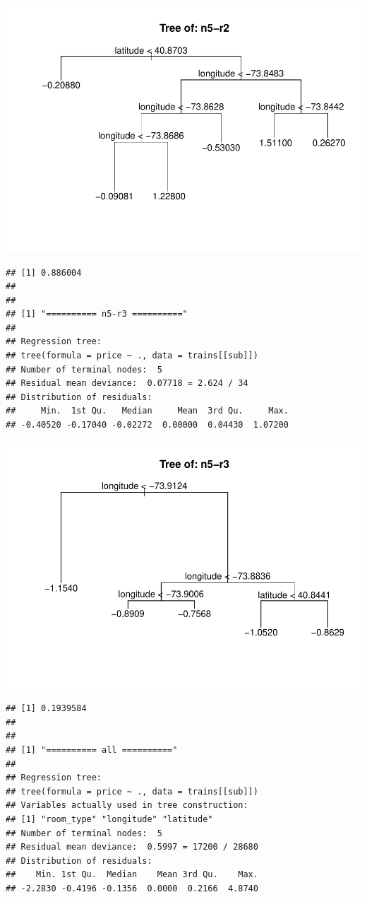 \documentclass[
]{article}
\begin{document}
\includegraphics{project-code_files/figure-latex/unnamed-chunk-14-18.pdf}

\begin{verbatim}
## [1] 0.886004
## 
## 
## [1] "========== n5-r3 =========="
## 
## Regression tree:
## tree(formula = price ~ ., data = trains[[sub]])
## Number of terminal nodes:  5 
## Residual mean deviance:  0.07718 = 2.624 / 34 
## Distribution of residuals:
##     Min.  1st Qu.   Median     Mean  3rd Qu.     Max. 
## -0.40520 -0.17040 -0.02272  0.00000  0.04430  1.07200
\end{verbatim}

\includegraphics{project-code_files/figure-latex/unnamed-chunk-14-19.pdf}

\begin{verbatim}
## [1] 0.1939584
## 
## 
## [1] "========== all =========="
## 
## Regression tree:
## tree(formula = price ~ ., data = trains[[sub]])
## Variables actually used in tree construction:
## [1] "room_type" "longitude" "latitude" 
## Number of terminal nodes:  5 
## Residual mean deviance:  0.5997 = 17200 / 28680 
## Distribution of residuals:
##    Min. 1st Qu.  Median    Mean 3rd Qu.    Max. 
## -2.2830 -0.4196 -0.1356  0.0000  0.2166  4.8740
\end{verbatim}
\end{document}
